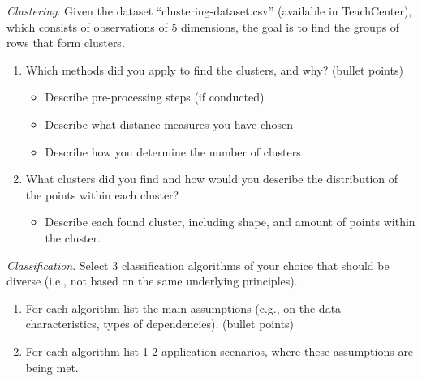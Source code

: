 \documentclass[a4paper,10pt]{article}\setlength{\textheight}{10in}\setlength{\textwidth}{6.5in}\setlength{\topmargin}{-0.125in}\setlength{\oddsidemargin}{-.2in}\setlength{\evensidemargin}{-.2in}\setlength{\headsep}{0.2in}\setlength{\footskip}{0pt}\usepackage{amsmath}\usepackage{fancyhdr}\usepackage{enumitem}\usepackage{hyperref}\usepackage{xcolor}\usepackage{graphicx}\pagestyle{fancy}
\begin{document}
\begin{enumerate}[topsep=0mm, partopsep=0mm, leftmargin=*]
{\color{blue}
\newpage\item \textit{Clustering}. Given the dataset ``clustering-dataset.csv'' (available in TeachCenter), which consists of observations of 5 dimensions, the goal is to find the groups of rows that form clusters.
\begin{enumerate}
	\item Which methods did you apply to find the clusters, and why? (bullet points)
	\begin{itemize}
		\item Describe pre-processing steps (if conducted)
		\item Describe what distance measures you have chosen
		\item Describe how you determine the number of clusters
	\end{itemize}
	\item What clusters did you find and how would you describe the distribution of the points within each cluster?
	\begin{itemize}
		\item Describe each found cluster, including shape, and amount of points within the cluster.
	\end{itemize}
\end{enumerate}
}




{\color{blue}
\newpage\item\textit{Classification}. Select 3 classification algorithms of your choice that should be diverse (i.e., not based on the same underlying principles).
\begin{enumerate}
	\item For each algorithm list the main assumptions (e.g., on the data characteristics, types of dependencies). (bullet points) 
	\item For each algorithm list 1-2 application scenarios, where these assumptions are being met.
\end{enumerate}
}



\end{enumerate}
\newpage


\end{document}
